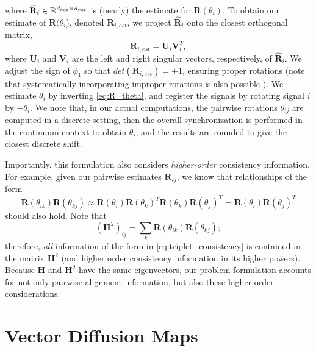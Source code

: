 where $\widehat{\mathbf{R}}_i \in \mathbb{R}^{d_{rot} \times d_{rot}}$ is (nearly) the estimate for $\mathbf{R}(\theta_i)$.
%
To obtain our estimate of $\mathbf{R}(\theta_i$), denoted $\mathbf{R}_{i, est}$, we project $\widehat{\mathbf{R}}_i$ onto the closest orthogonal matrix,
\begin{equation} \label{eq:R_est}
\mathbf{R}_{i, est} = \mathbf{U}_i \mathbf{V}_i^T,
\end{equation}
where $\mathbf{U}_i$ and $\mathbf{V}_i$ are the left and right singular vectors, respectively, of $\widehat{\mathbf{R}}_i$.
%
We adjust the sign of $\phi_1$ so that $det(\mathbf{R}_{i, est}) = +1$, ensuring proper rotations
(note that systematically incorporating improper rotations is also possible \citep{goemans1995improved, bandeira2013cheeger}).
%
We estimate $\theta_{i}$ by inverting \eqref{eq:R_theta}, and register the signals by rotating signal $i$ by $-\theta_i$.
%
We note that, in our actual computations, the pairwise rotations $\theta_{ij}$ are computed in a discrete setting, then the overall
synchronization is performed in the continuum context to obtain $\theta_i$, and the results are rounded to give the closest
discrete shift.

Importantly, this formulation also considers {\it higher-order} consistency information.
%
For example, given our pairwise estimates $\mathbf{R}_{ij}$, we know that relationships of the form
\begin{equation} \label{eq:triplet_consistency}
\mathbf{R}(\theta_{ik}) \mathbf{R}(\theta_{kj}) \approx \mathbf{R}(\theta_i) \mathbf{R}(\theta_k)^T \mathbf{R}(\theta_k) \mathbf{R}(\theta_j)^T = \mathbf{R}(\theta_i) \mathbf{R}(\theta_j)^T
\end{equation}
should also hold.
%
Note that
\begin{equation}
(\mathbf{H}^2)_{ij} = \sum_k \mathbf{R}(\theta_{ik}) \mathbf{R}(\theta_{kj});
\end{equation}
therefore, {\it all} information of the form in \eqref{eq:triplet_consistency} is contained in the matrix $\mathbf{H}^2$ (and higher order
consistency information in its higher powers).
%
Because $\mathbf{H}$ and $\mathbf{H}^2$ have the same eigenvectors, our problem formulation accounts for not only pairwise alignment information, but also these higher-order considerations.

\section{Vector Diffusion Maps}

